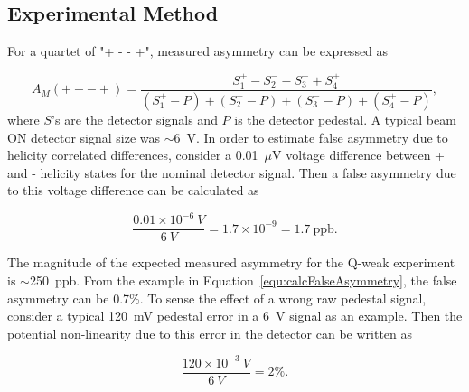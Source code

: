 

\subsection{Experimental Method}
\label{Experimental Method}

For a quartet of "+ - - +", measured asymmetry can be expressed as

\begin{equation} \label{equ:asymmetry}
A_{M} (+--+) = \frac{ S^{+}_{1} - S^{-}_{2} - S^{-}_{3} + S^{+}_{4} }{ (S^{+}_{1}-P) + (S^{-}_{2}-P) + (S^{-}_{3}-P) + (S^{+}_{4}-P) },
\end{equation}
where $S$'s are the detector signals and $P$ is the detector pedestal. A typical beam ON detector signal size was $\sim$6~V. In order to estimate false asymmetry due to helicity correlated differences, consider a 0.01~$\mu$V voltage difference between + and - helicity states for the nominal detector signal. Then a false asymmetry due to this voltage difference can be calculated as 

\begin{equation} \label{equ:calcFalseAsymmetry}
\frac{0.01\times10^{-6}~V}{6~V} = 1.7\times10^{-9} = 1.7~\text{ppb.}
\end{equation}

The magnitude of the expected measured asymmetry for the Q-weak experiment is $\sim$250~ppb. From the example in Equation~\ref{equ:calcFalseAsymmetry}, the false asymmetry can be 0.7\%. 
To sense the effect of a wrong raw pedestal signal, consider a typical 120~mV pedestal error in a 6~V signal as an example. Then the potential non-linearity due to this error in the detector can be written as

\begin{equation} \label{equ:calcPedError}
\frac{120\times10^{-3}~V}{6~V} = 2\%.
\end{equation}

